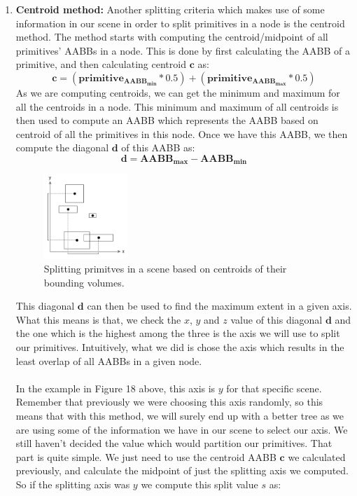 \documentclass[11pt,a4paper]{article}
\begin{document}
\begin{enumerate}
\item \textbf{Centroid method:}
Another splitting criteria which makes use of some information in our scene in order to split primitives in a node is the centroid method. The method starts with computing the centroid/midpoint of all primitives' AABBs in a node. This is done by first calculating the AABB of a primitive, and then calculating centroid $\boldsymbol{c}$ as:
\begin{equation}
\boldsymbol{c} = (\boldsymbol{primitive_{AABB_{min}}}*0.5)+(\boldsymbol{primitive_{AABB_{max}}}*0.5)
\end{equation}
As we are computing centroids, we can get the minimum and maximum for all the centroids in a node. This minimum and maximum of all centroids is then used to compute an AABB which represents the AABB based on centroid of all the primitives in this node. Once we have this AABB, we then compute the diagonal $\boldsymbol{d}$ of this AABB as:
\begin{equation}
\boldsymbol{d} = \boldsymbol{AABB_{max}} - \boldsymbol{AABB_{min}}
\end{equation}
\begin{figure}[H]
	\centering
	\captionsetup{justification=centering,margin=2cm}
	\includegraphics[width=0.3\textwidth]{centroid_bvh}
	\caption{Splitting primitves in a scene based on centroids of their bounding volumes. \protect\cite{pharr2016physically}}
\end{figure}
This diagonal $\boldsymbol{d}$ can then be used to find the maximum extent in a given axis. What this means is that, we check the $x$, $y$ and $z$ value of this diagonal $\boldsymbol{d}$ and the one which is the highest among the three is the axis we will use to split our primitives. Intuitively, what we did is chose the axis which results in the least overlap of all AABBs in a given node. 
\\~\\
In the example in Figure 18 above, this axis is $y$ for that specific scene. Remember that previously we were choosing this axis randomly, so this means that with this method, we will surely end up with a better tree as we are using some of the information we have in our scene to select our axis. We still haven't decided the value which would partition our primitives. That part is quite simple. We just need to use the centroid AABB $\boldsymbol{c}$ we calculated previously, and calculate the midpoint of just the splitting axis we computed. So if the splitting axis was $y$ we compute this split value $s$ as:

\end{enumerate}
\end{document}
